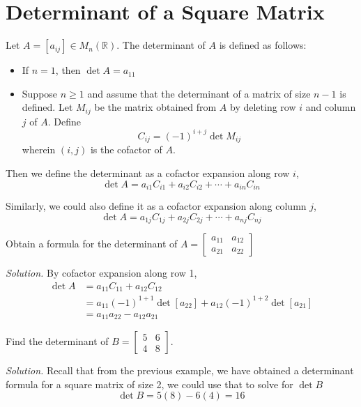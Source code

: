 \newpage
\section{Determinant of a Square Matrix}
Let $A = [a_{ij}]\in M_n(\mathbb{R})$. The determinant of $A$ is defined as follows:
\begin{itemize}
    \item If $n = 1$, then $\det A = a_{11}$
    \item Suppose $n \geq 1$ and assume that the determinant of a matrix of size $n - 1$ is defined. Let $M_{ij}$ be the matrix obtained from $A$ by deleting row $i$ and column $j$ of $A$. Define
    $$C_{ij} = (-1)^{i+j} \det M_{ij}$$ wherein $(i, j)$ is the cofactor of $A$.
\end{itemize}

Then we define the determinant as a cofactor expansion along row $i$,
$$\det A = a_{i1}C_{i1} + a_{i2}C_{i2} + \cdots + a_{in}C_{in}$$

Similarly, we could also define it as a cofactor expansion along column $j$,
$$\det A = a_{1j}C_{1j} + a_{2j}C_{2j} + \cdots + a_{nj}C_{nj}$$

\lline

\begin{example}
Obtain a formula for the determinant of $\displaystyle A = \left[ 
\begin{matrix}
    a_{11} & a_{12} \\
    a_{21} & a_{22}
\end{matrix}
\right]$
\end{example}

\textit{Solution.} By cofactor expansion along row 1,
\begin{align*}
\det A &= a_{11}C_{11} + a_{12}C_{12} \\
&=a_{11}(-1)^{1+1}\det [a_{22}] + a_{12}(-1)^{1+2}\det [a_{21}] \\
&=\boxed{a_{11}a_{22} - a_{12}a_{21}}
\end{align*}

\begin{example}
Find the determinant of $\displaystyle B = \left[
\begin{matrix}
    5 & 6 \\
    4 & 8
\end{matrix}
\right]$.
\end{example}

\textit{Solution.} Recall that from the previous example, we have obtained a determinant formula for a square matrix of size 2, we could use that to solve for $\det B$
$$\det B = 5(8) - 6(4) = \boxed{16}$$

